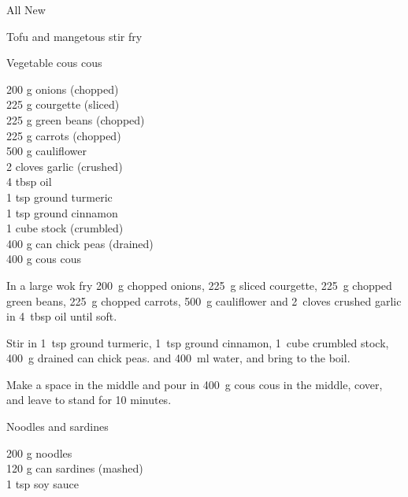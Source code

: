 \begin{menu}{All New}
\begin{recipe}{2}{Tofu and mangetous stir fry}
\begin{instructions}
    \end{instructions}
    \end{recipe}%
  
    \begin{recipe}{2}{Vegetable cous cous}%
    
		\begin{ingredients}
		200 g onions (chopped) \\
	225 g courgette (sliced) \\
	225 g green beans (chopped) \\
	225 g carrots (chopped) \\
	500 g cauliflower  \\
	2 cloves garlic (crushed) \\
	4 tbsp oil  \\
	1 tsp ground turmeric  \\
	1 tsp ground cinnamon  \\
	1 cube stock (crumbled) \\
	400 g can chick peas (drained) \\
	400 g cous cous  \\
	
		\end{ingredients}
	
    \begin{instructions}
    \item 
        In a large wok fry
        200~g chopped onions,
        225~g sliced courgette,
        225~g chopped green beans,
        225~g chopped carrots,
        500~g  cauliflower
        and
        2~cloves crushed garlic
        in
        4~tbsp  oil
        until soft.
      \item 
        Stir in
        1~tsp  ground turmeric,
        1~tsp  ground cinnamon,
        1~cube crumbled stock,
        400~g drained can chick peas.
        and
        400~ml  water,
        and bring to the boil.
      \item 
        Make a space in the middle and pour in
        400~g  cous cous
        in the middle, cover,
        and leave to stand for 10 minutes.
      
    \end{instructions}
    \end{recipe}%
  
    \begin{recipe}{1}{Noodles and sardines}%
    
		\begin{ingredients}
		200 g noodles  \\
	120 g can sardines (mashed) \\
	1 tsp soy sauce  \\
	

\end{ingredients}
\end{recipe}
\end{menu}
